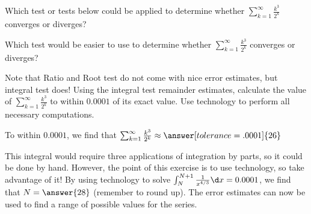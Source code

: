 \documentclass{ximera}
\author{Jim Talamo}
\begin{document}
\begin{exercise}

Which test or tests below could be applied to determine whether $\sum_{k=1}^{\infty} \frac{k^3}{2^k}$ converges or diverges?

\begin{selectAll}
\end{selectAll}

Which test would be easier to use to determine whether $\sum_{k=1}^{\infty} \frac{k^3}{2^k}$ converges or diverges?

\begin{multipleChoice}
\end{multipleChoice}

\begin{exercise}
Note that Ratio and Root test do not come with nice error estimates,
but integral test does!  Using the integral test remainder estimates,
calculate the value of $\sum_{k=1}^{\infty} \frac{k^3}{2^k}$ to within
$0.0001$ of its exact value.  Use technology to perform all necessary
computations.


To within $0.0001$, we find that $\sum_{k=1}^{\infty}
\frac{k^3}{2^k} \approx \answer[tolerance=.0001]{26}$
\begin{hint}
This integral would require three applications of integration by
parts, so it could be done by hand.  However, the point of this
exercise is to use technology, so take advantage of it!  By using
technology to solve $\int_N^{N+1} \frac{1}{x^{4/3}} \d x =0.0001$, we
find that $N = \answer{28}$ (remember to round up).  The error
estimates can now be used to find a range of possible values for the
series.
\end{hint}

\end{exercise}
\end{exercise}
\end{document}
